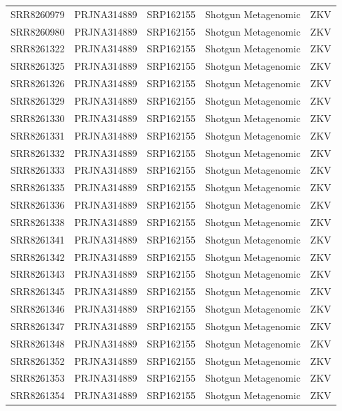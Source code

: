 \begin{longtable}{@{}lllll@{}}
SRR8260979 & PRJNA314889 & SRP162155 & Shotgun Metagenomic   & ZKV      \\
SRR8260980 & PRJNA314889 & SRP162155 & Shotgun Metagenomic   & ZKV      \\
SRR8261322 & PRJNA314889 & SRP162155 & Shotgun Metagenomic   & ZKV      \\
SRR8261325 & PRJNA314889 & SRP162155 & Shotgun Metagenomic   & ZKV      \\
SRR8261326 & PRJNA314889 & SRP162155 & Shotgun Metagenomic   & ZKV      \\
SRR8261329 & PRJNA314889 & SRP162155 & Shotgun Metagenomic   & ZKV      \\
SRR8261330 & PRJNA314889 & SRP162155 & Shotgun Metagenomic   & ZKV      \\
SRR8261331 & PRJNA314889 & SRP162155 & Shotgun Metagenomic   & ZKV      \\
SRR8261332 & PRJNA314889 & SRP162155 & Shotgun Metagenomic   & ZKV      \\
SRR8261333 & PRJNA314889 & SRP162155 & Shotgun Metagenomic   & ZKV      \\
SRR8261335 & PRJNA314889 & SRP162155 & Shotgun Metagenomic   & ZKV      \\
SRR8261336 & PRJNA314889 & SRP162155 & Shotgun Metagenomic   & ZKV      \\
SRR8261338 & PRJNA314889 & SRP162155 & Shotgun Metagenomic   & ZKV      \\
SRR8261341 & PRJNA314889 & SRP162155 & Shotgun Metagenomic   & ZKV      \\
SRR8261342 & PRJNA314889 & SRP162155 & Shotgun Metagenomic   & ZKV      \\
SRR8261343 & PRJNA314889 & SRP162155 & Shotgun Metagenomic   & ZKV      \\
SRR8261345 & PRJNA314889 & SRP162155 & Shotgun Metagenomic   & ZKV      \\
SRR8261346 & PRJNA314889 & SRP162155 & Shotgun Metagenomic   & ZKV      \\
SRR8261347 & PRJNA314889 & SRP162155 & Shotgun Metagenomic   & ZKV      \\
SRR8261348 & PRJNA314889 & SRP162155 & Shotgun Metagenomic   & ZKV      \\
SRR8261352 & PRJNA314889 & SRP162155 & Shotgun Metagenomic   & ZKV      \\
SRR8261353 & PRJNA314889 & SRP162155 & Shotgun Metagenomic   & ZKV      \\
SRR8261354 & PRJNA314889 & SRP162155 & Shotgun Metagenomic   & ZKV      \\

\end{longtable}
